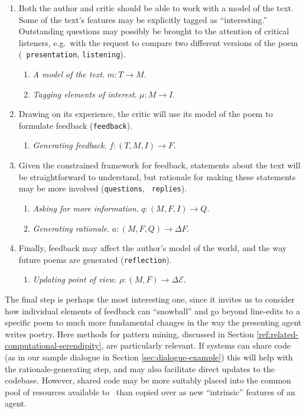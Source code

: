 \begin{enumerate}[label=\Roman*.]
\item Both the author and critic should be able to work with a model
  of the text.  Some of the text's features may be explicitly tagged
  as ``interesting.''  Outstanding questions may possibly be
  brought to the attention of critical listeners, e.g.~with the
  request to compare two different versions of the poem ({\tt
    presentation}, {\tt listening}).
\begin{enumerate}[label=\arabic*.]
\item \emph{A model of the text}. $m: T\rightarrow M$.
\item \emph{Tagging elements of interest}. $\mu: M\rightarrow I$.
\end{enumerate}
\item Drawing on its experience, the critic will use its model of the
  poem to formulate feedback ({\tt feedback}).
\begin{enumerate}[label=\arabic*.]
\item \emph{Generating feedback}. $f: (T,M,I)\rightarrow F$.
\end{enumerate}
\item Given the constrained framework for feedback, statements about
  the text will be straightforward to understand, but rationale for
  making these statements may be more involved ({\tt questions}, {\tt
    replies}).
\begin{enumerate}[label=\arabic*.]
\item \emph{Asking for more information}. $q: (M,F,I) \rightarrow Q$.
\item \emph{Generating rationale}. $a: (M,F,Q) \rightarrow \Delta F$.
\end{enumerate}
\item Finally, feedback may affect the author's model of the world, and the way future poems are generated ({\tt reflection}).
\begin{enumerate}[label=\arabic*.]
\item \emph{Updating point of view}. $\rho: (M,F) \rightarrow \Delta\mathcal{E}$.
\end{enumerate}
\end{enumerate}

The final step is perhaps the most interesting one, since it invites us
to consider how individual elements of feedback can ``snowball'' and
go beyond line-edits to a specific poem to much more fundamental
changes in the way the presenting agent writes poetry.  Here methods
for pattern mining, discussed in Section
\ref{ref:related-computational-serendipity}, are particularly relevant.
If systems can share code (as in our sample dialogue in Section
\ref{sec:dialogue-example}) this will help with the
rationale-generating step, and may also facilitate direct updates to
the codebase.  However, shared code may be more suitably placed into
the common pool of resources available to \Fw\ than copied over as
new ``intrinsic'' features of an agent.

